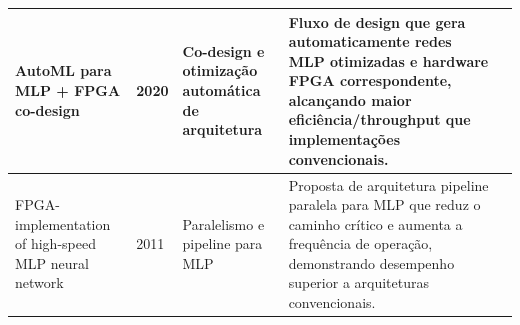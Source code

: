 \begin{table}[H]
{\begin{tabular}{p{3cm} p{2.8cm} p{5.0cm} p{5.0cm} p{2.8cm}}
			AutoML para MLP + FPGA co-design &
			2020 &
			Co-design e otimização automática de arquitetura &
			Fluxo de design que gera automaticamente redes MLP otimizadas e hardware FPGA correspondente, alcançando maior eficiência/throughput que implementações convencionais. &
			\citeonline{colangelo2020automl} \\ \hline
			
			FPGA-implementation of high-speed MLP neural network &
			2011 &
			Paralelismo e pipeline para MLP &
			Proposta de arquitetura pipeline paralela para MLP que reduz o caminho crítico e aumenta a frequência de operação, demonstrando desempenho superior a arquiteturas convencionais. &
			\citeonline{bahoura2011fpga} \\ \hline
			

			
	\end{tabular}}
\end{table}


%
%
%
%
%
%
%

